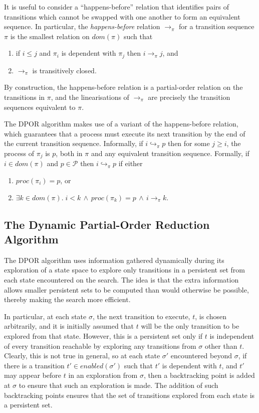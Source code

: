 \documentclass[12pt,a4paper,twoside,openright]{report}
\begin{document}
It is useful to consider a
``happens-before'' relation that identifies
pairs of transitions which
cannot be swapped with one another
to form an equivalent sequence.
In particular, the \emph{happens-before}
relation $\longrightarrow_\pi$ for a transition
sequence $\pi$ is the smallest relation on
$\textit{dom}(\pi)$ such that
\begin{enumerate}
	\item if $i \leq j$ and $\pi_i$ is dependent with
		$\pi_j$ then $i \longrightarrow_\pi j$, and
	\item $\longrightarrow_\pi$ is transitively closed.
\end{enumerate}
By construction, the happens-before relation is a
partial-order relation on the transitions in $\pi$,
and the linearisations of $\longrightarrow_\pi$
are precisely the transition sequences equivalent
to $\pi$.

The DPOR algorithm makes use of a variant of the
happens-before relation, which guarantees that a
process must execute its next transition by the
end of the current transition sequence.
Informally, if $i \hookrightarrow_\pi p$ then
for some $j \geq i$,
the process of $\pi_j$ 
is $p$, both in $\pi$ and any
equivalent transition sequence.
Formally, 
if $i \in \textit{dom}(\pi)$ and $p \in
\mathcal{P}$ then $i \hookrightarrow_\pi p$ if
either
\begin{enumerate}
	\item $\textit{proc}(\pi_i) = p$, or
	\item $\exists k \in \textit{dom}(\pi).\;
	i < k \,\wedge\, \textit{proc}(\pi_k) = p
	\,\wedge\, i \longrightarrow_\pi k $.
\end{enumerate}


\subsection{The Dynamic Partial-Order Reduction Algorithm}

The DPOR algorithm
uses information gathered dynamically during its
exploration of a state space to explore only
transitions in a persistent set from each state
encountered on the search. The idea is that the
extra information allows smaller
persistent sets to be computed than would
otherwise be possible, thereby making the
search more efficient.

In particular, at each state $\sigma$, the
next transition
to execute, $t$, is chosen arbitrarily, and it is
initially assumed that $t$ will
be the only transition to be explored from
that state. However, this is a persistent
set only if $t$ is
independent of every transition reachable
by exploring any transitions
from $\sigma$ other than $t$. Clearly,
this is not true in general, so at each
state $\sigma'$ encountered beyond
$\sigma$, if there is a transition
$t' \in \textit{enabled}(\sigma')$
such that $t'$ is dependent with
$t$, and $t'$ may appear before $t$
in an exploration from $\sigma$, then
a backtracking point is added at
$\sigma$ to ensure that such an
exploration is made.
The addition of such backtracking points
ensures that the set of transitions
explored from each state is a
persistent set.
\end{document}
